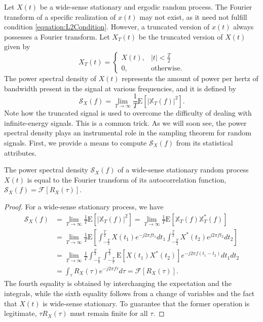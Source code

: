 Let $X(t)$ be a wide-sense stationary and ergodic random process.
The Fourier transform of a specific realization of $x(t)$ may not exist, as it need not fulfill condition \eqref{equation:L2Condition}.
However, a truncated version of $x(t)$ always possesses a Fourier transform.
Let $X_T(t)$ be the truncated version of $X(t)$ given by
\begin{equation*}
X_T(t) = \begin{cases} X(t), & |t| < \frac{T}{2} \\
0, & \text{otherwise} . \end{cases}
\end{equation*}
The power spectral density of $X(t)$ represents the amount of power per hertz of bandwidth present in the signal at various frequencies, and it is defined by
\begin{equation*}
\mathcal{S}_X(f) = \lim_{T \rightarrow \infty} \frac{1}{T} \mathrm{E} \left[ |\mathbb{X}_T(f)|^2 \right] .
\end{equation*}
Note how the truncated signal is used to overcome the difficulty of dealing with infinite-energy signals.
This is a common trick.
As we will soon see, the power spectral density plays an instrumental role in the sampling theorem for random signals.
First, we provide a means to compute $\mathcal{S}_X(f)$ from its statistical attributes.

\begin{theorem}
The power spectral density $\mathcal{S}_X (f)$ of a wide-sense stationary random process $X(t)$ is equal to the Fourier transform of its autocorrelation function, $\mathcal{S}_X (f) = \mathcal{F} [R_X (\tau)]$.
\end{theorem}
\begin{proof}
For a wide-sense stationary process, we have
\begin{equation*}
\begin{split}
\mathcal{S}_X(f) &= \lim_{T \rightarrow \infty} \frac{1}{T} \mathrm{E} \left[ |\mathbb{X}_T(f)|^2 \right]
= \lim_{T \rightarrow \infty} \frac{1}{T} \mathrm{E} \left[ \mathbb{X}_T(f) \mathbb{X}_T^*(f) \right] \\
&= \lim_{T \rightarrow \infty} \frac{1}{T} \mathrm{E} \left[
\int_{-\frac{T}{2}}^{\frac{T}{2}} X(t_1) e^{-j2 \pi f t_1} dt_1
\int_{-\frac{T}{2}}^{\frac{T}{2}} X^*(t_2) e^{j2 \pi f t_2} dt_2 \right] \\
&= \lim_{T \rightarrow \infty} \frac{1}{T}
\int_{-\frac{T}{2}}^{\frac{T}{2}} \int_{-\frac{T}{2}}^{\frac{T}{2}}
\mathrm{E} \left[ X(t_1) X^*(t_2) \right]
e^{-j2 \pi f (t_1-t_2)} dt_1 dt_2 \\
&= \int_{\tau} R_X (\tau) e^{-j2 \pi f\tau} d\tau
= \mathcal{F} [ R_X (\tau) ] .
\end{split}
\end{equation*}
The fourth equality is obtained by interchanging the expectation and the integrals, while the sixth equality follows from a change of variables and the fact that $X(t)$ is wide-sense stationary.
To guarantee that the former operation is legitimate, $\tau R_X(\tau)$ must remain finite for all $\tau$.
\end{proof}


